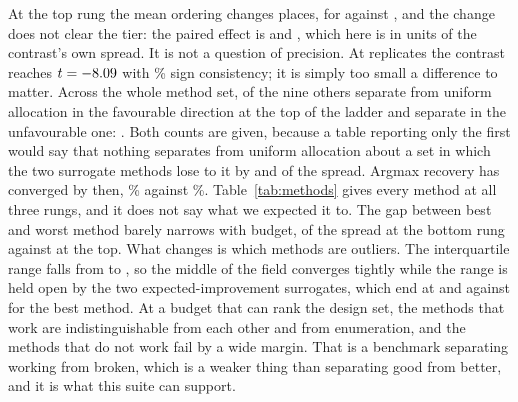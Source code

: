 \documentclass[11pt]{article}
\begin{document}
At the top rung the mean ordering changes places, \RsCrossTopAdapt{} for \RsCrossTop{} against
\RsCrossTopUni{}, and the change does not clear the tier: the paired effect is \RsCrossTopEff{} and
\RsCrossTopBinds{}, which here is \RsCrossTopMpe{} in units of the contrast's own spread. It is not
a question of precision. At \RsReplicates{} replicates the contrast reaches $t = -8.09{}$
with \RsCrossTopSign{}\% sign consistency; it is simply too small a difference to matter. Across the
whole method set, \RsBeatGrid{} of the nine others separate from uniform allocation in the
favourable direction at the top of the ladder and \RsWorseGrid{} separate in the unfavourable one:
\RsWorseGridNames{}. Both counts are given, because a table reporting only the first would say that
nothing separates from uniform allocation about a set in which the two surrogate methods lose to it
by \RsGpEiVsGridEff{} and \RsGpNoisyVsGridEff{} of the spread. Argmax recovery has converged by
then, \RsCrossTopUniFound{}\% against \RsCrossTopAdaptFound{}\%. Table~\ref{tab:methods} gives every
method at all three rungs, and it does not say what we expected it to. The gap between best and
worst method barely narrows with budget, \RsRangeLow{} of the spread at the bottom rung against
\RsRangeTop{} at the top. What changes is which methods are outliers. The interquartile range falls
from \RsIqrLow{} to \RsIqrTop{}, so the middle of the field converges tightly while the range is
held open by the two expected-improvement surrogates, which end at \RsTopGpEi{} and \RsTopGpNoisy{}
against \RsCrossTopAdapt{} for the best method. At a budget that can rank the design set, the
methods that work are indistinguishable from each other and from enumeration, and the methods that
do not work fail by a wide margin. That is a benchmark separating working from broken, which is a
weaker thing than separating good from better, and it is what this suite can support.

\begin{table}[H]
\centering
\caption{Every method at three points on each problem's budget ladder, averaged over the
\RsCells{} cells all \RsMethods{} methods reached. Normalized regret is the fraction of the
achievable spread the returned design gives up, so lower is better and zero is the best design.
Argmax recovery is over the \RsGradeable{} problems whose key can rank its design set. Rows are
ordered by top-rung regret; the two enumeration baselines are italicised. The ordering at the top
rung is real and is not actionable: the best adaptive method leads uniform allocation by less than
the \RsCrossTopMpe{} of spread the tier asks for.}
\label{tab:methods}

\end{table}
\end{document}
